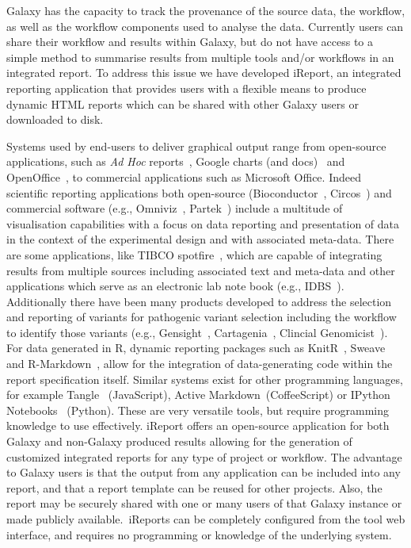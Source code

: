 Galaxy has the capacity to track the provenance of the source data, the workflow, as well as the workflow components used to analyse the data. Currently users can share their workflow and results within Galaxy, but do not have access to a simple method to summarise results from multiple tools and/or workflows in an integrated report. To address this issue we have developed iReport, an integrated reporting application that provides users with a flexible means to produce dynamic HTML reports which can be shared with other Galaxy users or downloaded to disk.

Systems used by end-users to deliver graphical output range from open-source applications, such as \emph{Ad Hoc} reports~\cite{url-adhoc}, Google charts (and docs)~\cite{url-googlecharts} and OpenOffice~\cite{url-openoffice}, to commercial applications such as Microsoft Office.
Indeed scientific reporting applications both open-source (Bioconductor~\cite{url-bioconductor}, Circos~\cite{circos}\cite{url-circos}) and commercial software (e.g., Omniviz~\cite{url-omniviz}, Partek~\cite{url-partek}) include a multitude of visualisation capabilities with a focus on data reporting and presentation of data in the context of the experimental design and with associated meta-data.
There are some applications, like TIBCO spotfire~\cite{url-spotfire}, which are capable of integrating results from multiple sources including associated text and meta-data and other applications which serve as an electronic lab note book (e.g., IDBS~\cite{url-idbs}).
Additionally there have been many products developed to address the selection and reporting of variants for pathogenic variant selection including the workflow to identify those variants (e.g., Gensight~\cite{url-gensight}, Cartagenia~\cite{url-cartagenia}, Clincial Genomicist~\cite{clinicalgenomist}).
For data generated in R, dynamic reporting packages such as KnitR~\cite{url-knitr}, Sweave~\cite{sweave} and R-Markdown~\cite{url-rmarkdown}, allow for the integration of data-generating code within the report specification itself. Similar systems exist for other programming languages, for example Tangle~\cite{url-tangle} (JavaScript), Active Markdown~\cite{url-activemarkdown}(CoffeeScript) or IPython Notebooks~\cite{url-ipythonnotebook} (Python).
These are very versatile tools, but require programming knowledge to use effectively. iReport offers an open-source application for both Galaxy and non-Galaxy produced results allowing for the generation of customized integrated reports for any type of project or workflow.
The advantage to Galaxy users is that the output from any application can be included into any report, and that a report template can be reused for other projects.
Also, the report may be securely shared with one or many users of that Galaxy instance or made publicly available.\ iReports can be completely configured from the tool web interface, and requires no programming or knowledge of the underlying system.


